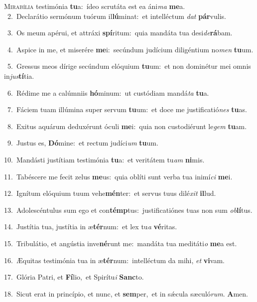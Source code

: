 \lettrine{\initial\textcolor{\initialcolor}{M}}{irabília} testimónia \textbf{tu}\-a:~\star ídeo scrutáta est ea áni\textit{ma} \textbf{me}\-a.\\
{\numbfont\textcolor{\numbcolor}{~2.}}~Declarátio sermónum tuórum il\-\textbf{lú}\-minat:~\star et intelléctum \textit{dat} \textbf{pár}\-vulis.\par
{\numbfont\textcolor{\numbcolor}{~3.}}~Os meum apérui, et attráxi \textbf{spí}\-ritum:~\star quia mandáta tua desi\-\textit{de}\-\textbf{rá}bam.\par
{\numbfont\textcolor{\numbcolor}{~4.}}~Aspice in me, et miserére \textbf{me}\-i:~\star secúndum judícium diligéntium no\textit{men} \textbf{tu}\-um.\par
{\numbfont\textcolor{\numbcolor}{~5.}}~Gressus meos dírige secúndum elóquium \textbf{tu}\-um:~\star et non dominétur mei omnis in\-\textit{jus}\-\textbf{tí}tia.\par
{\numbfont\textcolor{\numbcolor}{~6.}}~Rédime me a calúmniis \textbf{hó}\-minum:~\star ut custódiam mandá\textit{ta} \textbf{tu}\-a.\par
{\numbfont\textcolor{\numbcolor}{~7.}}~Fáciem tuam illúmina super servum \textbf{tu}\-um:~\star et doce me justificatió\textit{nes} \textbf{tu}\-as.\par
{\numbfont\textcolor{\numbcolor}{~8.}}~Exitus aquárum deduxérunt óculi \textbf{me}\-i:~\star quia non custodiérunt le\textit{gem} \textbf{tu}\-am.\par
{\numbfont\textcolor{\numbcolor}{~9.}}~Justus es, \textbf{Dó}\-mine:~\star et rectum judíci\textit{um} \textbf{tu}\-um.\par
{\numbfont\textcolor{\numbcolor}{10.}}~Mandásti justítiam testimónia \textbf{tu}\-a:~\star et veritátem tu\textit{am} \textbf{ni}\-mis.\par
{\numbfont\textcolor{\numbcolor}{11.}}~Tabéscere me fecit zelus \textbf{me}\-us:~\star quia oblíti sunt verba tua inimí\textit{ci} \textbf{me}\-i.\par
{\numbfont\textcolor{\numbcolor}{12.}}~Ignítum elóquium tuum vehe\-\textbf{mén}\-ter:~\star et servus tuus dilé\textit{xit} \textbf{il}\-lud.\par
{\numbfont\textcolor{\numbcolor}{13.}}~Adolescéntulus sum ego et con\-\textbf{témp}\-tus:~\star justificatiónes tuas non sum \textit{ob}\-\textbf{lí}tus.\par
{\numbfont\textcolor{\numbcolor}{14.}}~Justítia tua, justítia in æ\-\textbf{tér}\-num:~\star et lex tu\textit{a} \textbf{vé}\-ritas.\par
{\numbfont\textcolor{\numbcolor}{15.}}~Tribulátio, et angústia inve\-\textbf{né}\-runt me:~\star mandáta tua meditáti\textit{o} \textbf{me}\-a est.\par
{\numbfont\textcolor{\numbcolor}{16.}}~Æquitas testimónia tua in æ\-\textbf{tér}\-num:~\star intelléctum da mihi, \textit{et} \textbf{vi}\-vam.\par
{\numbfont\textcolor{\numbcolor}{17.}}~Glória Patri, et \textbf{Fí}\-lio,~\star et Spirítu\textit{i} \textbf{Sanc}\-to.\par
{\numbfont\textcolor{\numbcolor}{18.}}~Sicut erat in princípio, et nunc, et \textbf{sem}\-per,~\star et in sǽcula sæculó\-\textit{rum}\-. \textbf{A}\-men.\par
